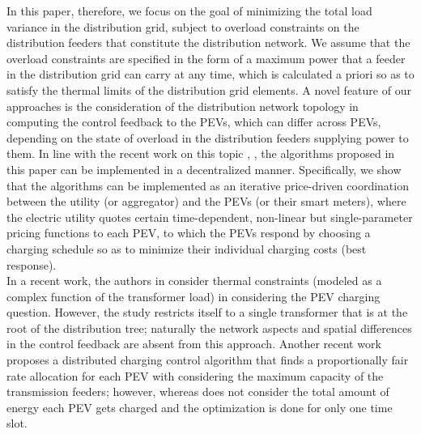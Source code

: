 \documentclass[12pt,draftcls,onecolumn]{IEEEtran}
\begin{document}
\indent In this paper, therefore, we focus on the goal of minimizing the total load variance in the distribution grid, subject to overload constraints on the distribution feeders that constitute the distribution network. We assume that the overload constraints are specified in the form of a maximum power that a feeder in the distribution grid can carry at any time, which is calculated a priori so as to satisfy the thermal limits of the distribution grid elements. A novel feature of our approaches is the consideration of the distribution network topology in computing the control feedback to the PEVs, which can differ across PEVs, depending on the state of overload in the distribution feeders supplying power to them.  In line with the recent work on this topic \cite{MCH10}, \cite{GTL13},  the algorithms proposed in this paper can be implemented in a decentralized manner. Specifically, we show that the algorithms can be implemented as an iterative price-driven coordination between the utility (or aggregator) and the PEVs (or their smart meters), where the electric utility quotes certain time-dependent, non-linear but single-parameter pricing functions to each PEV, to which the PEVs respond by choosing a charging schedule so as to minimize their individual charging costs (best response).\\
\indent In a recent work, the authors in \cite{HAH12} consider thermal constraints (modeled as a complex function of the transformer load) in considering the PEV charging question. However, the study restricts itself to a single transformer that is at the root of the distribution tree; naturally the network aspects and spatial differences in the control feedback are absent from this approach. Another recent work \cite{ARK13} proposes a distributed charging control algorithm that finds a proportionally fair rate allocation for each PEV with considering the maximum capacity of the transmission feeders; however, whereas \cite{ARK13} does not consider the total amount of energy each PEV gets charged and the optimization is done for only one time slot. 
\end{document}
